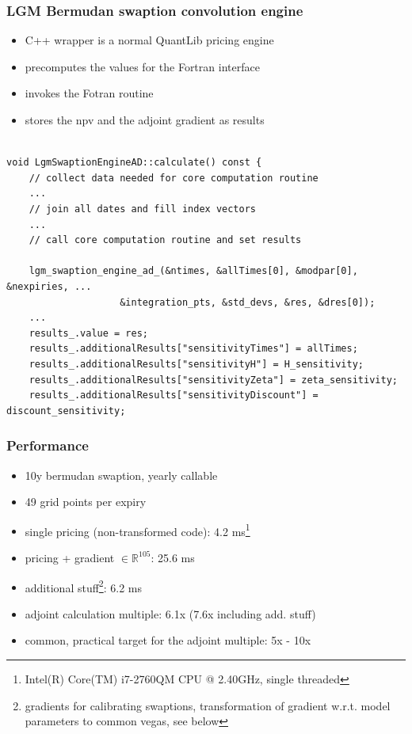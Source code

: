 \documentclass{beamer}
\begin{document}
\begin{frame}[fragile]
\frametitle{LGM Bermudan swaption convolution engine}
\begin{itemize}
\item C++ wrapper is a normal QuantLib pricing engine
\item precomputes the values for the Fortran interface
\item invokes the Fotran routine
\item stores the npv and the adjoint gradient as results
\end{itemize}
\begin{verbatim}

void LgmSwaptionEngineAD::calculate() const {
    // collect data needed for core computation routine
    ...
    // join all dates and fill index vectors
    ...
    // call core computation routine and set results

    lgm_swaption_engine_ad_(&ntimes, &allTimes[0], &modpar[0], &nexpiries, ...
                    &integration_pts, &std_devs, &res, &dres[0]);
    ...
    results_.value = res;
    results_.additionalResults["sensitivityTimes"] = allTimes;
    results_.additionalResults["sensitivityH"] = H_sensitivity;
    results_.additionalResults["sensitivityZeta"] = zeta_sensitivity;
    results_.additionalResults["sensitivityDiscount"] = discount_sensitivity;
\end{verbatim}
\end{frame}

\begin{frame}[fragile]
\frametitle{Performance}
\begin{itemize}
\item 10y bermudan swaption, yearly callable
\item 49 grid points per expiry
\item single pricing (non-transformed code): 4.2 ms\footnote{Intel(R) Core(TM) i7-2760QM CPU @ 2.40GHz, single threaded}
\item pricing + gradient $\in \mathbb{R}^{105}$: 25.6 ms
\item additional stuff\footnote{gradients for calibrating swaptions, transformation of gradient w.r.t. model parameters to common vegas, see below}: 6.2 ms
\item adjoint calculation multiple: 6.1x (7.6x including add. stuff)
\item common, practical target for the adjoint multiple: 5x - 10x
\end{itemize}
\end{frame}
\end{document}
